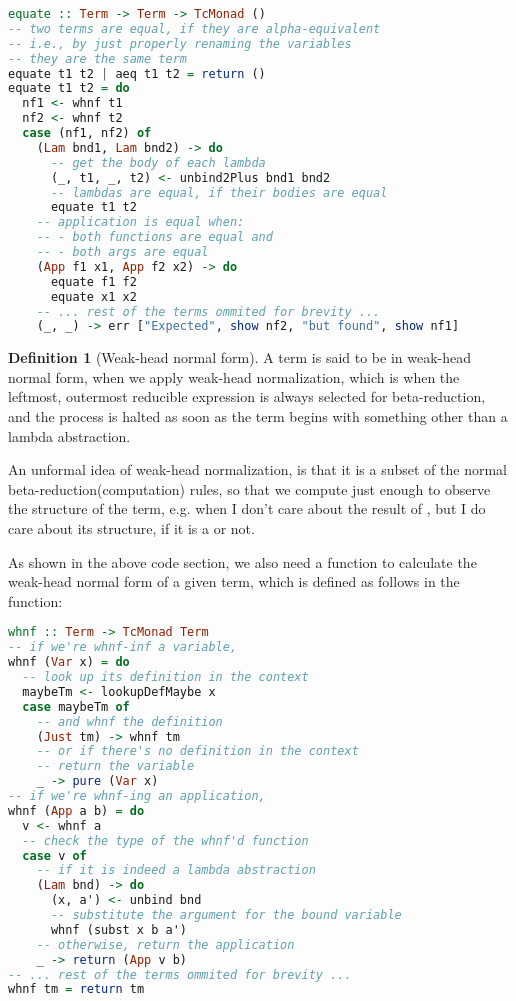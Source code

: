 \documentclass[
       embeddedlogo,
       english,
       lmodern,
       coorientadorbanca,
       noabntexcite
]{ufsc-thesis-rn46-2019}
\theoremstyle{definition}
\newtheorem{definition}{Definition}[section]
\newcommand{\code}[1]{\text{\scpfamily\setlength\spaceskip{0.35em}#1}}
\begin{document}
\begin{lstlisting}[language=Haskell]
equate :: Term -> Term -> TcMonad ()
-- two terms are equal, if they are alpha-equivalent
-- i.e., by just properly renaming the variables
-- they are the same term
equate t1 t2 | aeq t1 t2 = return ()
equate t1 t2 = do
  nf1 <- whnf t1
  nf2 <- whnf t2
  case (nf1, nf2) of
    (Lam bnd1, Lam bnd2) -> do
      -- get the body of each lambda
      (_, t1, _, t2) <- unbind2Plus bnd1 bnd2
      -- lambdas are equal, if their bodies are equal
      equate t1 t2
    -- application is equal when:
    -- - both functions are equal and
    -- - both args are equal
    (App f1 x1, App f2 x2) -> do
      equate f1 f2
      equate x1 x2
    -- ... rest of the terms ommited for brevity ...
    (_, _) -> err ["Expected", show nf2, "but found", show nf1]
\end{lstlisting}


\begin{definition}[Weak-head normal form]
       A term is said to be in weak-head normal form, when we apply weak-head normalization, which is when the leftmost, outermost reducible expression is always selected for beta-reduction, and the process is halted as soon as the term begins with something other than a lambda abstraction.~\cite{advancedtapl}

       An unformal idea of weak-head normalization, is that it is a subset of the normal beta-reduction(computation) rules, so that we compute just enough to observe the structure of the term, e.g. when I don't care about the result of \code{factorial 100}, but I do care about its structure, if it is a \code{Nat} or not.
\end{definition}

As shown in the above code section, we also need a function to calculate the weak-head normal form of a given term, which is defined as follows in the \code{whnf} function:

\begin{lstlisting}[language=Haskell]
whnf :: Term -> TcMonad Term
-- if we're whnf-inf a variable,
whnf (Var x) = do
  -- look up its definition in the context
  maybeTm <- lookupDefMaybe x
  case maybeTm of
    -- and whnf the definition
    (Just tm) -> whnf tm
    -- or if there's no definition in the context
    -- return the variable 
    _ -> pure (Var x)
-- if we're whnf-ing an application,
whnf (App a b) = do
  v <- whnf a
  -- check the type of the whnf'd function
  case v of
    -- if it is indeed a lambda abstraction
    (Lam bnd) -> do
      (x, a') <- unbind bnd
      -- substitute the argument for the bound variable
      whnf (subst x b a')
    -- otherwise, return the application
    _ -> return (App v b)
-- ... rest of the terms ommited for brevity ...
whnf tm = return tm
\end{lstlisting}
\end{document}
